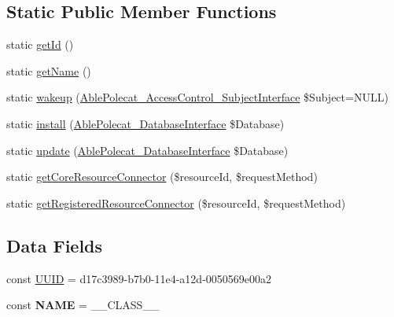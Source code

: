 \subsection*{Static Public Member Functions}
\begin{DoxyCompactItemize}
\item 
static \hyperlink{class_able_polecat___registry___connector_acfaa3a96d0cb5a4c0d4d710dcba41e9e}{get\+Id} ()
\item 
static \hyperlink{class_able_polecat___registry___connector_a4ef9bd37ba3ce8a13c1e8bcf4f72a630}{get\+Name} ()
\item 
static \hyperlink{class_able_polecat___registry___connector_a3f2135f6ad45f51d075657f6d20db2cd}{wakeup} (\hyperlink{interface_able_polecat___access_control___subject_interface}{Able\+Polecat\+\_\+\+Access\+Control\+\_\+\+Subject\+Interface} \$Subject=N\+U\+L\+L)
\item 
static \hyperlink{class_able_polecat___registry___connector_a97e9bacf538c072e0542eeb96d2475af}{install} (\hyperlink{interface_able_polecat___database_interface}{Able\+Polecat\+\_\+\+Database\+Interface} \$Database)
\item 
static \hyperlink{class_able_polecat___registry___connector_a8398510e79e9787266fe116d6431948c}{update} (\hyperlink{interface_able_polecat___database_interface}{Able\+Polecat\+\_\+\+Database\+Interface} \$Database)
\item 
static \hyperlink{class_able_polecat___registry___connector_acc115629812d7e8a4f6aaea17adc0697}{get\+Core\+Resource\+Connector} (\$resource\+Id, \$request\+Method)
\item 
static \hyperlink{class_able_polecat___registry___connector_ac32fe543f752a87d424ab7c5c5f7e69f}{get\+Registered\+Resource\+Connector} (\$resource\+Id, \$request\+Method)
\end{DoxyCompactItemize}
\subsection*{Data Fields}
\begin{DoxyCompactItemize}
\item 
const \hyperlink{class_able_polecat___registry___connector_a74b892c8c0b86bf9d04c5819898c51e7}{U\+U\+I\+D} = \textquotesingle{}d17c3989-\/b7b0-\/11e4-\/a12d-\/0050569e00a2\textquotesingle{}
\item 
\hypertarget{class_able_polecat___registry___connector_a244352f035b82b20b0efa506167fd862}{}const {\bfseries N\+A\+M\+E} = \+\_\+\+\_\+\+C\+L\+A\+S\+S\+\_\+\+\_\+\label{class_able_polecat___registry___connector_a244352f035b82b20b0efa506167fd862}

\end{DoxyCompactItemize}

